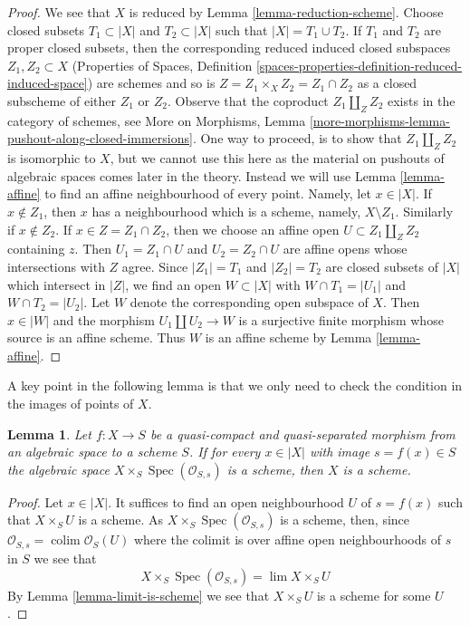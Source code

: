 \documentclass{stacks-project}
\theoremstyle{plain}
\newtheorem{lemma}[subsection]{Lemma}
\theoremstyle{definition}
\theoremstyle{remark}
\numberwithin{equation}{subsection}
\def\lim{\mathop{\mathrm{lim}}\nolimits}
\def\colim{\mathop{\mathrm{colim}}\nolimits}
\def\Spec{\mathop{\mathrm{Spec}}}
\begin{document}
\begin{proof}
We see that $X$ is reduced by Lemma \ref{lemma-reduction-scheme}.
Choose closed subsets $T_1 \subset |X|$ and $T_2 \subset |X|$ such that
$|X| = T_1 \cup T_2$. If $T_1$ and $T_2$ are proper closed subsets,
then the corresponding reduced induced closed subspaces $Z_1, Z_2 \subset X$
(Properties of Spaces, Definition
\ref{spaces-properties-definition-reduced-induced-space})
are schemes and so is $Z = Z_1 \times_X Z_2 = Z_1 \cap Z_2$ as a closed
subscheme of either $Z_1$ or $Z_2$. Observe that the coproduct
$Z_1 \amalg_Z Z_2$ exists in the category of schemes, see
More on Morphisms, Lemma
\ref{more-morphisms-lemma-pushout-along-closed-immersions}.
One way to proceed, is to show that $Z_1 \amalg_Z Z_2$ is isomorphic to $X$,
but we cannot use this here as the material on pushouts of algebraic
spaces comes later in the theory. Instead we will use
Lemma \ref{lemma-affine} to find an affine neighbourhood of every point.
Namely, let $x \in |X|$. If $x \not \in Z_1$, then $x$ has a neighbourhood
which is a scheme, namely, $X \setminus Z_1$. Similarly if $x \not \in Z_2$.
If $x \in Z = Z_1 \cap Z_2$, then we choose an affine open
$U \subset Z_1 \amalg_Z Z_2$ containing $z$. Then $U_1 = Z_1 \cap U$
and $U_2 = Z_2 \cap U$ are affine opens whose intersections with
$Z$ agree. Since $|Z_1| = T_1$ and $|Z_2| = T_2$ are closed subsets of
$|X|$ which intersect in $|Z|$, we find an open $W \subset |X|$
with $W \cap T_1 = |U_1|$ and $W \cap T_2 = |U_2|$. Let $W$ denote the
corresponding open subspace of $X$. Then $x \in |W|$ and the morphism
$U_1 \amalg U_2 \to W$ is a surjective finite morphism whose source
is an affine scheme. Thus $W$ is an affine scheme by
Lemma \ref{lemma-affine}.
\end{proof}

\noindent
A key point in the following lemma is that we only need to check
the condition in the images of points of $X$.

\begin{lemma}
\label{lemma-enough-local}
Let $f: X \to S$ be a quasi-compact and quasi-separated morphism from an
algebraic space to a scheme $S$. If for every $x \in |X|$ with image
$s = f(x) \in S$ the algebraic space $X \times_S \Spec(\mathcal{O}_{S,s})$
is a scheme, then $X$ is a scheme.
\end{lemma}

\begin{proof}
Let $x \in |X|$. It suffices to find an open neighbourhood $U$ of
$s = f(x)$ such that $X \times_S U$ is a scheme.
As $X \times_S \Spec(\mathcal{O}_{S, s})$ is a scheme, then, since
$\mathcal{O}_{S, s} = \colim \mathcal{O}_S(U)$ where the colimit is
over affine open neighbourhoods of $s$ in $S$ we see that
$$
X \times_S \Spec(\mathcal{O}_{S, s}) = \lim X \times_S U
$$
By Lemma \ref{lemma-limit-is-scheme} we see that $X \times_S U$
is a scheme for some $U$.
\end{proof}
\end{document}
